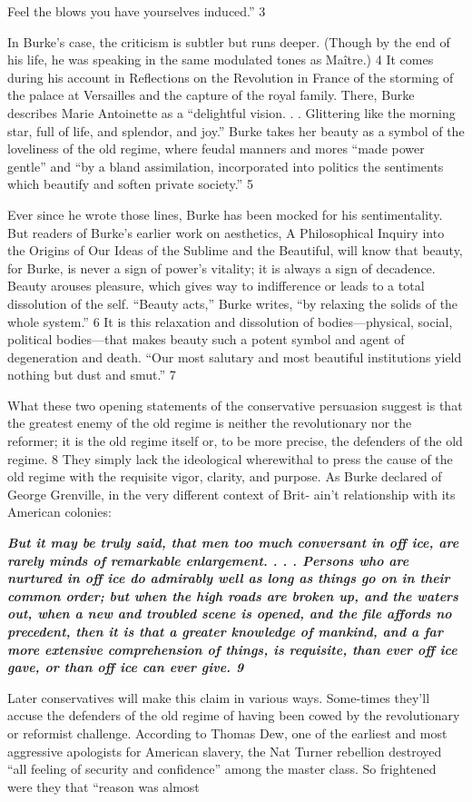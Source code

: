 Feel the blows you have yourselves induced.” {\color{blue} 3 } {\par} In Burke’s case, the criticism is subtler but runs deeper. (Though by the end of his life, he was speaking in the same modulated tones as Maître.) {\color{blue} 4 } It comes during his account in Reflections on the Revolution in France of the storming of the palace at Versailles and the capture of the royal family. There, Burke describes Marie Antoinette as a “delightful vision. . . Glittering like the morning star, full of life, and splendor, and joy.” Burke takes her beauty as a symbol of the loveliness of the old regime, where feudal manners and mores “made power gentle” and “by a bland assimilation, incorporated into politics the sentiments which beautify and soften private society.” {\color{blue} 5 } {\par} Ever since he wrote those lines, Burke has been mocked for his sentimentality. But readers of Burke’s earlier work on aesthetics, A Philosophical Inquiry into the Origins of Our Ideas of the Sublime and the Beautiful, will know that beauty, for Burke, is never a sign of power’s vitality; it is always a sign of decadence. Beauty arouses pleasure, which gives way to indifference or leads to a total dissolution of the self. “Beauty acts,” Burke writes, “by relaxing the solids of the whole system.” {\color{blue} 6 } It is this relaxation and dissolution of bodies—physical, social, political bodies—that makes beauty such a potent symbol and agent of degeneration and death. “Our most salutary and most beautiful institutions yield nothing but dust and smut.” {\color{blue} 7 } {\par} What these two opening statements of the conservative persuasion suggest is that the greatest enemy of the old regime is neither the revolutionary nor the reformer; it is the old regime itself or, to be more precise, the defenders of the old regime. {\color{blue} 8 } They simply lack the ideological wherewithal to press the cause of the old regime with the requisite vigor, clarity, and purpose. As Burke declared of George Grenville, in the very different context of Brit- ain't relationship with its American colonies:{\par} {\textbf{\textit{But it may be truly said, that men too much conversant in off ice, are rarely minds of remarkable enlargement. . . . Persons who are nurtured in off ice do admirably well as long as things go on in their common order; but when the high roads are broken up, and the waters out, when a new and troubled scene is opened, and the file affords no precedent, then it is that a greater knowledge of mankind, and a far more extensive comprehension of things, is requisite, than ever off ice gave, or than off ice can ever give. {\color{blue} 9 } } } }{\par} Later conservatives will make this claim in various ways. Some-times they’ll accuse the defenders of the old regime of having been cowed by the revolutionary or reformist challenge. According to Thomas Dew, one of the earliest and most aggressive apologists for American slavery, the Nat Turner rebellion destroyed “all feeling of security and confidence” among the master class. So frightened were they that “reason was almost 